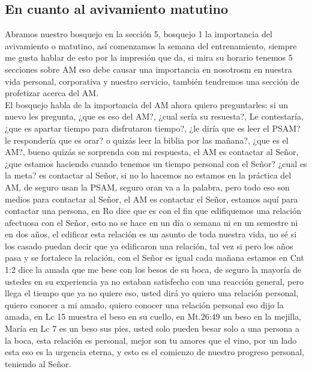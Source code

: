 \documentclass[12pt]{article}
\begin{document}
\subsection*{En cuanto al avivamiento matutino}

Abramos nuestro bosquejo en la sección 5, bosquejo 1 la importancia del avivamiento o matutino, así comenzamos la semana del entrenamiento, siempre me gusta hablar de esto por la impresión que da, si mira su horario tenemos 5 secciones sobre AM eso debe causar una importancia en nosotrosm en nuestra vida personal, corporativa y nuestro servicio, también tendremos una sección de profetizar acerca del AM.\\

El bosquejo habla de la importancia del AM ahora quiero preguntarles: si un nuevo les pregunta, ¿que es eso del AM?, ¿cual sería su resuesta?, Le contestaría, ¿que es apartar tiempo para disfrutaron tiempo?, ¿le diría que es leer el PSAM? le respondería que es orar? o quizás leer la biblia por las mañana?, ¿que es el AM?, bueno quizás se sorprenda con mi respuesta, el AM es contactar al Señor, ¿que estamos haciendo cuando tenemos un tiempo personal con el Señor? ¿cual es la meta? es contactar al Señor, si no lo hacemos no estamos en la práctica del AM, de seguro usan la PSAM, seguro oran va a la palabra, pero todo eso son medios para contactar al Señor, el AM es contactar el Señor, estamos aquí para contactar una persona, en Ro dice que es con el fin que edifiquemos una relación afectuosa con el Señor, esto no se hace en un día o semana ni en un semestre ni en dos años, el edificar esta relación es un asunto de toda nuestra vida, no sé si los casado puedan decir que ya edificaron una relación, tal vez si pero los años pasa y se fortalece la relación, con el Señor es igual cada mañana estamos en Cnt 1:2 dice la amada que me bese con los besos de su boca, de seguro la mayoría de ustedes en su experiencia ya no estaban satisfecho con una reacción general, pero llega el tiempo que ya no quiere eso, usted dirá yo quiero una relación personal, quiero conocer a mi amado, quiero conocer una relación personal eso dijo la amada, en Lc 15 muestra el beso en su cuello, en Mt.26:49 un beso en la mejilla, María en Lc 7 es un beso sus pies, usted solo pueden besar solo a una persona a la boca, esta relación es personal, mejor son tu amores que el vino, por un lado esta eso es la urgencia eterna, y esto es el comienzo de nuestro progreso personal, teniendo al Señor.\\
\end{document}
